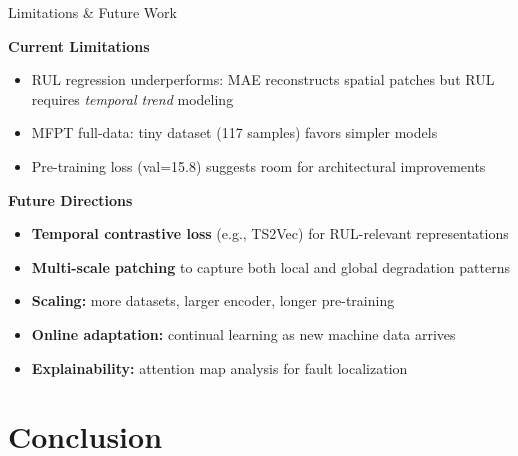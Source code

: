 \documentclass[aspectratio=169, 11pt]{beamer}
\begin{document}
\begin{frame}{Limitations \& Future Work}

\textbf{Current Limitations}
\begin{itemize}
    \item RUL regression underperforms: MAE reconstructs spatial patches but RUL requires \emph{temporal trend} modeling
    \item MFPT full-data: tiny dataset (117 samples) favors simpler models
    \item Pre-training loss (val=15.8) suggests room for architectural improvements
\end{itemize}

\vspace{0.4cm}
\textbf{Future Directions}
\begin{itemize}
    \item \textbf{Temporal contrastive loss} (e.g., TS2Vec) for RUL-relevant representations
    \item \textbf{Multi-scale patching} to capture both local and global degradation patterns
    \item \textbf{Scaling:} more datasets, larger encoder, longer pre-training
    \item \textbf{Online adaptation:} continual learning as new machine data arrives
    \item \textbf{Explainability:} attention map analysis for fault localization
\end{itemize}
\end{frame}

\section{Conclusion}
\end{document}
